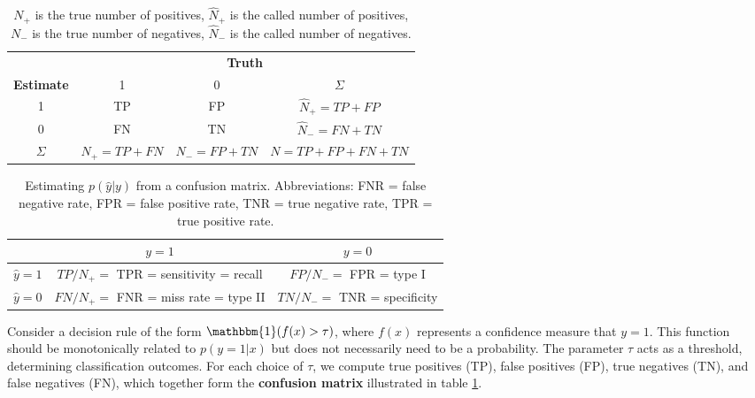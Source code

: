 \documentclass[12pt, a4paper]{article}
\theoremstyle{definition}
\numberwithin{figure}{section}
\numberwithin{equation}{section}
\numberwithin{table}{section}
\begin{document}
\begin{table}[h]
    \centering
    \renewcommand{\arraystretch}{1.5}
    \begin{tabular}{c|c|c|c|}
        \multicolumn{1}{c}{} & \multicolumn{3}{c}{\textbf{Truth}} \\
        \cline{2-4}
        \textbf{Estimate} & 1 & 0 & $\Sigma$ \\
        \hline
        1 & TP & FP & $\hat{N}_+ = TP + FP$ \\
        0 & FN & TN & $\hat{N}_- = FN + TN$ \\
        \hline
        $\Sigma$ & $N_+ = TP + FN$ & $N_- = FP + TN$ & $N = TP + FP + FN + TN$ \\
        \hline
    \end{tabular}
    \caption{$N_+$ is the true number of positives, $\hat{N}_+$ is the called number of positives, $N_-$ is the true number of negatives, $\hat{N}_-$ is the called number of negatives.}
    \label{tab:confusion_matrix}
\end{table}

\begin{table}[h]
    \centering
    \renewcommand{\arraystretch}{1.5}
    \begin{tabular}{c|c|c|}
        \hline
        & $y = 1$ & $y = 0$ \\
        \hline
        $\hat{y} = 1$ & $TP / N_+ =$ TPR = sensitivity = recall & $FP / N_- =$ FPR = type I \\
        \hline
        $\hat{y} = 0$ & $FN / N_+ =$ FNR = miss rate = type II & $TN / N_- =$ TNR = specificity \\
        \hline
    \end{tabular}
    \caption{Estimating $p(\hat{y} | y)$ from a confusion matrix. Abbreviations: FNR = false negative rate, FPR = false positive rate, TNR = true negative rate, TPR = true positive rate.}
    \label{tab:confusion_probs}
\end{table}

Consider a decision rule of the form $\mathbbm{1}(f(x) > \tau)$, where $f(x)$ represents a confidence measure that $y = 1$. This function should be monotonically related to $p(y = 1 | x)$ but does not necessarily need to be a probability. The parameter $\tau$ acts as a threshold, determining classification outcomes. For each choice of $\tau$, we compute true positives (TP), false positives (FP), true negatives (TN), and false negatives (FN), which together form the \textbf{confusion matrix} illustrated in table \ref{tab:confusion_matrix}.  
\end{document}
